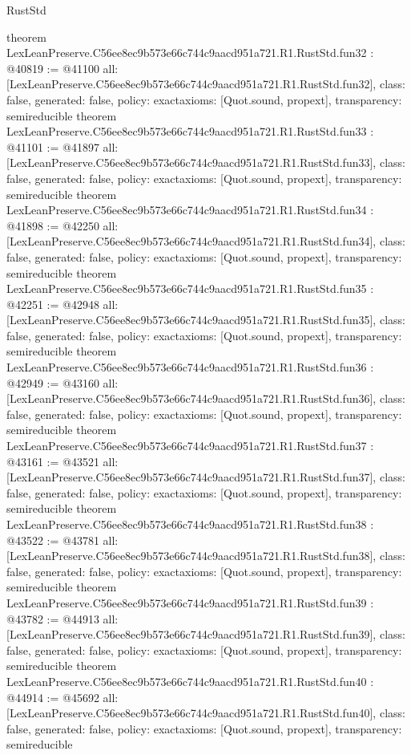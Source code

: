 \begin{lexlean}{RustStd}
\begin{coremodule}
{}
theorem LexLeanPreserve.C56ee8ec9b573e66c744c9aacd951a721.R1.RustStd.fun32 : @40819 := @41100 {
  all: [LexLeanPreserve.C56ee8ec9b573e66c744c9aacd951a721.R1.RustStd.fun32],
  class: false,
  generated: false,
  policy: exact{axioms: [Quot.sound, propext]},
  transparency: semireducible
}
theorem LexLeanPreserve.C56ee8ec9b573e66c744c9aacd951a721.R1.RustStd.fun33 : @41101 := @41897 {
  all: [LexLeanPreserve.C56ee8ec9b573e66c744c9aacd951a721.R1.RustStd.fun33],
  class: false,
  generated: false,
  policy: exact{axioms: [Quot.sound, propext]},
  transparency: semireducible
}
theorem LexLeanPreserve.C56ee8ec9b573e66c744c9aacd951a721.R1.RustStd.fun34 : @41898 := @42250 {
  all: [LexLeanPreserve.C56ee8ec9b573e66c744c9aacd951a721.R1.RustStd.fun34],
  class: false,
  generated: false,
  policy: exact{axioms: [Quot.sound, propext]},
  transparency: semireducible
}
theorem LexLeanPreserve.C56ee8ec9b573e66c744c9aacd951a721.R1.RustStd.fun35 : @42251 := @42948 {
  all: [LexLeanPreserve.C56ee8ec9b573e66c744c9aacd951a721.R1.RustStd.fun35],
  class: false,
  generated: false,
  policy: exact{axioms: [Quot.sound, propext]},
  transparency: semireducible
}
theorem LexLeanPreserve.C56ee8ec9b573e66c744c9aacd951a721.R1.RustStd.fun36 : @42949 := @43160 {
  all: [LexLeanPreserve.C56ee8ec9b573e66c744c9aacd951a721.R1.RustStd.fun36],
  class: false,
  generated: false,
  policy: exact{axioms: [Quot.sound, propext]},
  transparency: semireducible
}
theorem LexLeanPreserve.C56ee8ec9b573e66c744c9aacd951a721.R1.RustStd.fun37 : @43161 := @43521 {
  all: [LexLeanPreserve.C56ee8ec9b573e66c744c9aacd951a721.R1.RustStd.fun37],
  class: false,
  generated: false,
  policy: exact{axioms: [Quot.sound, propext]},
  transparency: semireducible
}
theorem LexLeanPreserve.C56ee8ec9b573e66c744c9aacd951a721.R1.RustStd.fun38 : @43522 := @43781 {
  all: [LexLeanPreserve.C56ee8ec9b573e66c744c9aacd951a721.R1.RustStd.fun38],
  class: false,
  generated: false,
  policy: exact{axioms: [Quot.sound, propext]},
  transparency: semireducible
}
theorem LexLeanPreserve.C56ee8ec9b573e66c744c9aacd951a721.R1.RustStd.fun39 : @43782 := @44913 {
  all: [LexLeanPreserve.C56ee8ec9b573e66c744c9aacd951a721.R1.RustStd.fun39],
  class: false,
  generated: false,
  policy: exact{axioms: [Quot.sound, propext]},
  transparency: semireducible
}
theorem LexLeanPreserve.C56ee8ec9b573e66c744c9aacd951a721.R1.RustStd.fun40 : @44914 := @45692 {
  all: [LexLeanPreserve.C56ee8ec9b573e66c744c9aacd951a721.R1.RustStd.fun40],
  class: false,
  generated: false,
  policy: exact{axioms: [Quot.sound, propext]},
  transparency: semireducible
}
\end{coremodule}
\end{lexlean}
